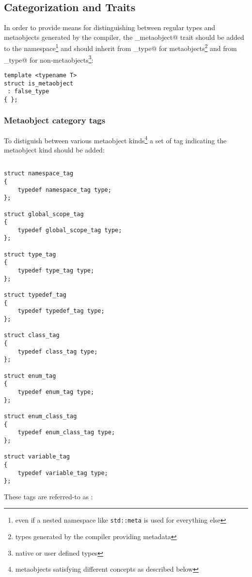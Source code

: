 \subsection{Categorization and Traits}

In order to provide means for distinguishing between regular types
and metaobjects generated by the compiler,
the \verb@is_metaobject@ trait should be added to the \verb@std@ namespace\footnote{
even if a nested namespace like \texttt{std::meta} is used for everything else}
and should inherit from \verb@true_type@ for metaobjects\footnote{types generated
by the compiler providing metadata} and from \verb@false_type@
for non-metaobjects\footnote{native or user defined types}:

\begin{verbatim}
template <typename T>
struct is_metaobject
 : false_type
{ };
\end{verbatim}

\subsubsection{Metaobject category tags}
\label{metaobject-category-tags}

To distiguish between various metaobject kinds\footnote{metaobjects satisfying different concepts
as described below} a set of tag \verb@struct@s indicating the metaobject kind
should be added:

\begin{verbatim}

struct namespace_tag
{
	typedef namespace_tag type;
};

struct global_scope_tag
{
	typedef global_scope_tag type;
};

struct type_tag
{
	typedef type_tag type;
};

struct typedef_tag
{
	typedef typedef_tag type;
}; 

struct class_tag
{
	typedef class_tag type;
};

struct enum_tag
{
	typedef enum_tag type;
};

struct enum_class_tag
{
	typedef enum_class_tag type;
};

struct variable_tag
{
	typedef variable_tag type;
};

\end{verbatim}

These tags are referred-to as \verb@MetaobjectCategory@:

